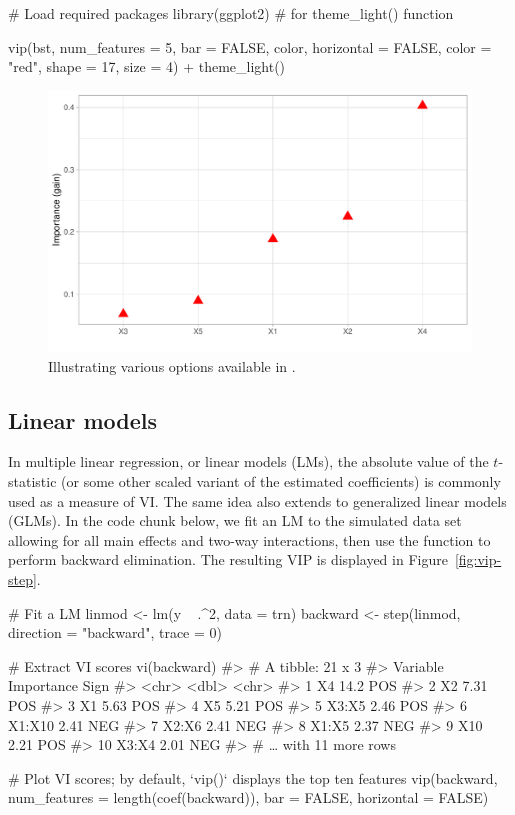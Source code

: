 \begin{example}
# Load required packages
library(ggplot2)  # for theme_light() function

vip(bst, num_features = 5, bar = FALSE, color, horizontal = FALSE, 
    color = "red", shape = 17, size = 4) +
  theme_light()
\end{example}

\begin{figure}[!htb]
  \centering 
  \includegraphics[width=1\linewidth]{figures/dot-plot} 
  \caption{Illustrating various options available in .}
  \label{fig:dot-plot}
\end{figure}


\subsection{Linear models}

In multiple linear regression, or linear models (LMs), the absolute value of the $t$-statistic (or some other scaled variant of the estimated coefficients) is commonly used as a measure of VI. The same idea also extends to generalized linear models (GLMs). In the code chunk below, we fit an LM to the simulated  data set allowing for all main effects and two-way interactions, then use the  function to perform backward elimination. The resulting VIP is displayed in Figure~\ref{fig:vip-step}.

\begin{example}
# Fit a LM
linmod <- lm(y ~ .^2, data = trn)
backward <- step(linmod, direction = "backward", trace = 0)

# Extract VI scores
vi(backward)
#> # A tibble: 21 x 3
#>    Variable Importance Sign 
#>    <chr>         <dbl> <chr>
#>  1 X4            14.2  POS  
#>  2 X2             7.31 POS  
#>  3 X1             5.63 POS  
#>  4 X5             5.21 POS  
#>  5 X3:X5          2.46 POS  
#>  6 X1:X10         2.41 NEG  
#>  7 X2:X6          2.41 NEG  
#>  8 X1:X5          2.37 NEG  
#>  9 X10            2.21 POS  
#> 10 X3:X4          2.01 NEG  
#> # … with 11 more rows

# Plot VI scores; by default, `vip()` displays the top ten features
vip(backward, num_features = length(coef(backward)), 
    bar = FALSE, horizontal = FALSE)
\end{example}

